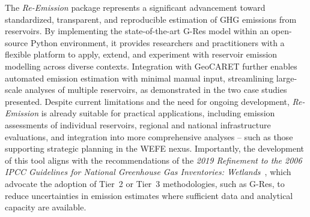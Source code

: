 \documentclass[review, authoryear, 1p]{elsarticle} %
\begin{document}
The \emph{Re-Emission} package represents a significant advancement toward standardized, transparent, and reproducible estimation of \acl{GHG} emissions from reservoirs.
By implementing the state-of-the-art G-Res model within an open-source Python environment, it provides researchers and practitioners with a flexible platform to apply, extend, and experiment with reservoir emission modelling across diverse contexts.
Integration with GeoCARET further enables automated emission estimation with minimal manual input, streamlining large-scale analyses of multiple reservoirs, as demonstrated in the two case studies presented.
Despite current limitations and the need for ongoing development, \emph{Re-Emission} is already suitable for practical applications, including emission assessments of individual reservoirs, regional and national infrastructure evaluations, and integration into more comprehensive analyses -- such as those supporting strategic planning in the \ac{WEFE} nexus.
Importantly, the development of this tool aligns with the recommendations of the \emph{2019 Refinement to the 2006 \acs{IPCC} Guidelines for National Greenhouse Gas Inventories: Wetlands}~\cite{IPCC2019}, which advocate the adoption of Tier~2 or Tier~3 methodologies, such as G-Res, to reduce uncertainties in emission estimates where sufficient data and analytical capacity are available.


\end{document}
